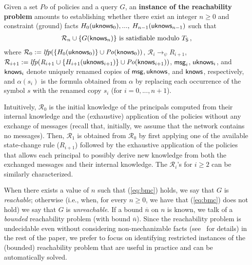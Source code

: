 \documentclass[conference]{llncs}
\newcommand{\know}{\ensuremath \mathsf{knows}}
\newcommand{\msg}{\ensuremath \mathsf{msg}}
\newcommand{\knowzero}{\ensuremath \mathsf{uknows}}
\begin{document}
\begin{definition}
\label{def:instofreachprob}
Given a set $\mathit{Po}$ of policies and a query $G$, an
  \textbf{instance of the reachability problem} amounts to
  establishing whether there exist an integer $n\geq 0$ and constraint (ground)
   facts $H_0(\knowzero_0), ...,$
  $H_{n-1}(\knowzero_{n-1})$ such that
  \begin{eqnarray}
    \label{eq:bmc}
    \mathcal{R}_n\cup \{ G(\know_n) \} \text{ is } \text{satisfiable modulo } 
    T_{\mathsf{S}}\,,
  \end{eqnarray}
where $\mathcal{R}_0 := \mathit{lfp}(\{H_0(\knowzero_0)\} \cup
  \mathit{Po}(\know_0))$, $\mathcal{R}_i \rightarrow_{\psi}
  \mathit{R}_{i+1}$, $\mathcal{R}_{i+1} :=
  \mathit{lfp}(\mathit{R}_{i+1} \cup \{H_{i+1}(\knowzero_{i+1})\} \cup
  \mathit{Po}(\know_{i+1}))$, $\msg_i$, $\knowzero_{i}$, and
  $\know_{i}$ denote uniquely renamed copies of $\msg, \knowzero$, and
  $\know$, respectively, and $\alpha(s_i)$ is the formula obtained
  from $\alpha$ by replacing each occurrence of the symbol $s$ with
  the renamed copy $s_i$ (for $i=0, ..., n+1$).  
  \end{definition}

Intuitively, $\mathcal{R}_0$ is the initial knowledge of the
principals computed from their internal knowledge and the (exhaustive)
application of the policies without any exchange of messages (recall
that, initially, we assume that the network contains no messages).
Then, $\mathcal{R}_1$ is obtained from $\mathcal{R}_0$ by first
applying one of the available state-change rule ($\mathit{R}_{i+1}$)
followed by the exhaustive application of the policies that allows
each principal to possibly derive new knowledge from both the
exchanged messages and their internal knowledge.  The
$\mathcal{R}_i$'s for $i\geq 2$ can be similarly characterized.

When there exists a value of $n$ such that
(\ref{eq:bmc}) holds, we say that $G$ is \emph{reachable}; otherwise
(i.e., when, for every $n\geq 0$, we have that (\ref{eq:bmc}) does not
hold) we say that $G$ is \emph{unreachable}.  If a bound $\overline{n}$ on $n$ is
known, we talk of a \emph{bounded} reachability  problem (with
bound $\overline{n}$). 
Since the reachability problem is undecidable even without
considering non-mechanizable facts (see~\cite{BRV-TR12} for
details) in the rest of the paper, we prefer to focus on identifying restricted
instances of the (bounded) reachability problem that are useful in
practice and can be automatically solved.
\end{document}
